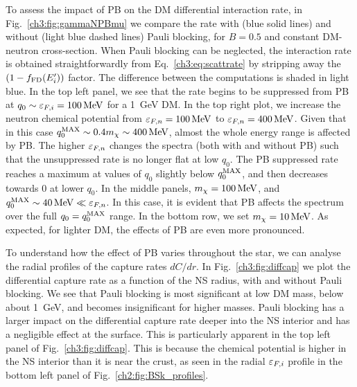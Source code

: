 To assess the impact of PB on the DM differential interaction rate, in Fig.~\ref{ch3:fig:gammaNPBmu} we compare the rate 
with (blue solid lines) and without (light blue dashed lines) Pauli blocking, for $B=0.5$ and constant DM-neutron cross-section. When Pauli blocking can be neglected, the interaction rate is obtained straightforwardly from Eq.~\ref{ch3:eq:scattrate} by stripping away the $(1 - f_{\rm FD}(E_i'))$ factor. 
The difference between the computations is shaded in light blue. In the top left panel, we see that the rate begins to be suppressed from PB at $q_0 \sim \varepsilon_{F,i} = 100{\rm \,MeV}$ for a 1~GeV DM.
In the top right plot, we increase the neutron chemical potential from $\varepsilon_{F,n}=100{\rm \,MeV}$ to $\varepsilon_{F,n}=400{\rm \,MeV}$. Given that in this case $q_0^{\rm MAX} \sim 0.4 m_\chi \sim 400{\rm \,MeV}$, almost the whole energy range is affected by PB. The higher $\varepsilon_{F,n}$ changes the spectra (both with and without PB) such that the unsuppressed rate is no longer flat at low $q_0$. The PB suppressed rate reaches a maximum at values of $q_0$ slightly below $q_0^{\rm MAX}$, and then decreases towards $0$ at lower $q_0$.
In the middle panels, $m_\chi=100{\rm \,MeV}$, and $q_0^{\rm MAX}\sim40{\rm \,MeV}\ll\varepsilon_{F,n}$. In this case, it is evident that PB affects the spectrum over the full $q_0=q_0^{\rm MAX}$ range. In the bottom row, we set $m_\chi=10{\rm \,MeV}$. As expected, for lighter DM,  the effects of PB are even more pronounced.



To understand how the effect of PB varies throughout the star, we can analyse the radial profiles of the capture rates $dC/dr$.
In Fig.~\ref{ch3:fig:diffcap} we plot the differential capture rate as a function of the NS radius, with and without Pauli blocking. We see that Pauli blocking is most significant at low DM mass, below about 1~GeV, and becomes insignificant for higher masses. Pauli blocking has a larger impact on the differential capture rate deeper into the NS interior and has a negligible effect at the surface. This is particularly apparent in the top left panel of Fig.~\ref{ch3:fig:diffcap}. This is because the chemical potential is higher in the NS interior than it is near the crust, as seen in the radial $\varepsilon_{F,i}$ profile in the bottom left panel of Fig.~\ref{ch2:fig:BSk_profiles}.

